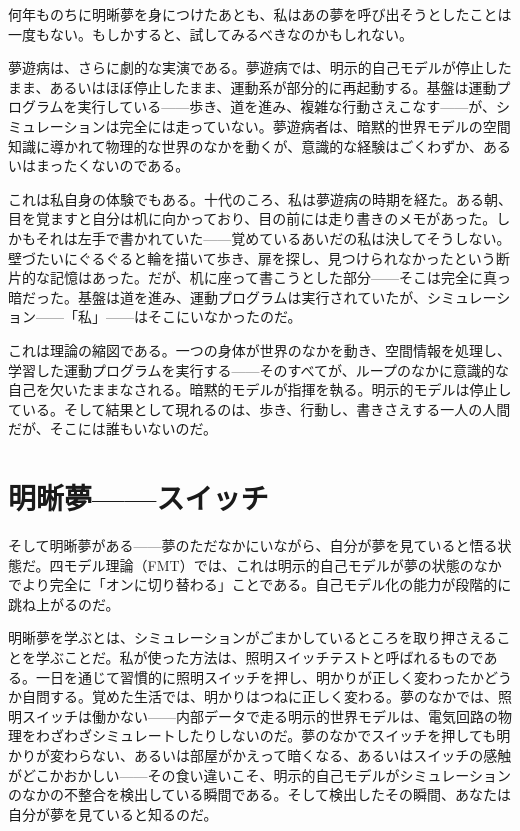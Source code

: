 \documentclass[11pt, twoside, openright]{book}
\begin{document}
何年ものちに明晰夢を身につけたあとも、私はあの夢を呼び出そうとしたことは一度もない。もしかすると、試してみるべきなのかもしれない。

夢遊病は、さらに劇的な実演である。夢遊病では、明示的自己モデルが停止したまま、あるいはほぼ停止したまま、運動系が部分的に再起動する。基盤は運動プログラムを実行している------歩き、道を進み、複雑な行動さえこなす------が、シミュレーションは完全には走っていない。夢遊病者は、暗黙的世界モデルの空間知識に導かれて物理的な世界のなかを動くが、意識的な経験はごくわずか、あるいはまったくないのである。

これは私自身の体験でもある。十代のころ、私は夢遊病の時期を経た。ある朝、目を覚ますと自分は机に向かっており、目の前には走り書きのメモがあった。しかもそれは左手で書かれていた------覚めているあいだの私は決してそうしない。壁づたいにぐるぐると輪を描いて歩き、扉を探し、見つけられなかったという断片的な記憶はあった。だが、机に座って書こうとした部分------そこは完全に真っ暗だった。基盤は道を進み、運動プログラムは実行されていたが、シミュレーション------「私」------はそこにいなかったのだ。

これは理論の縮図である。一つの身体が世界のなかを動き、空間情報を処理し、学習した運動プログラムを実行する------そのすべてが、ループのなかに意識的な自己を欠いたままなされる。暗黙的モデルが指揮を執る。明示的モデルは停止している。そして結果として現れるのは、歩き、行動し、書きさえする一人の人間だが、そこには誰もいないのだ。

\section*{明晰夢------スイッチ}

そして明晰夢がある------夢のただなかにいながら、自分が夢を見ていると悟る状態だ。四モデル理論（FMT）では、これは明示的自己モデルが夢の状態のなかでより完全に「オンに切り替わる」ことである。自己モデル化の能力が段階的に跳ね上がるのだ。

明晰夢を学ぶとは、シミュレーションがごまかしているところを取り押さえることを学ぶことだ。私が使った方法は、照明スイッチテストと呼ばれるものである。一日を通じて習慣的に照明スイッチを押し、明かりが正しく変わったかどうか自問する。覚めた生活では、明かりはつねに正しく変わる。夢のなかでは、照明スイッチは働かない------内部データで走る明示的世界モデルは、電気回路の物理をわざわざシミュレートしたりしないのだ。夢のなかでスイッチを押しても明かりが変わらない、あるいは部屋がかえって暗くなる、あるいはスイッチの感触がどこかおかしい------その食い違いこそ、明示的自己モデルがシミュレーションのなかの不整合を検出している瞬間である。そして検出したその瞬間、あなたは自分が夢を見ていると知るのだ。
\end{document}

